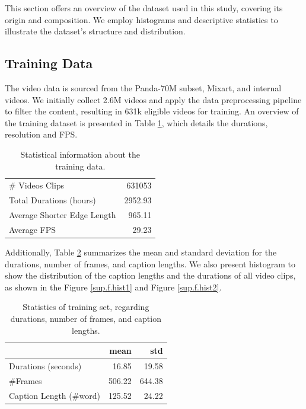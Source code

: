 This section offers an overview of the dataset used in this study, covering its origin and composition. We employ histograms and descriptive statistics to illustrate the dataset's structure and distribution.

\subsection{Training Data}

The video data is sourced from the Panda-70M subset, Mixart, and internal videos. We initially collect 2.6M videos and apply the data preprocessing pipeline to filter the content, resulting in 631k eligible videos for training. An overview of the training dataset is presented in Table \ref{sup.t1}, which details the durations, resolution and FPS.

\begin{table}[!ht]
\centering
\renewcommand{\arraystretch}{1.1}
\begin{tabular}{lr}
\toprule
    \# Videos Clips &  631053 \\
    Total Durations (hours) &  2952.93  \\
    Average Shorter Edge Length  &  965.11 \\
    Average FPS   &  29.23     \\ 
\bottomrule
\end{tabular}
\caption{Statistical information about the training data.}
\label{sup.t1}
\end{table}

Additionally, Table \ref{sup.t2} summarizes the mean and standard deviation for the durations, number of frames, and caption lengths. We also present histogram to show the distribution of the caption lengths and the durations of all video clips, as shown in the Figure \ref{sup.f.hist1} and Figure \ref{sup.f.hist2}. 

\begin{table}[!ht]
\centering
\renewcommand{\arraystretch}{1.1}
\begin{tabular}{lrr}
\toprule
    & mean & std \\ 
\midrule
    Durations (seconds) &  16.85  &    19.58    \\
    \#Frames &  506.22   &  644.38 \\
    Caption Length (\#word)   &  125.52 &  24.22  \\ 
\bottomrule
\end{tabular}
\caption{Statistics of training set, regarding durations, number of frames, and caption lengths.}
\label{sup.t2}
\end{table}

